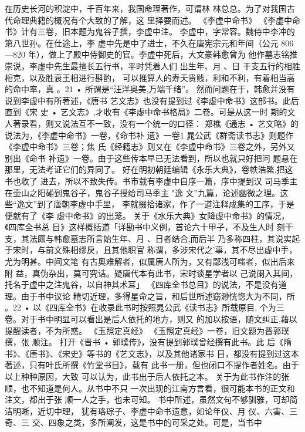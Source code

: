 在历史长河的积淀中，千百年来，我国命理著作，可谓林
林总总。为了对我国古代命理典籍的概况有个大致的了解，这
里择要而述。
《李虚中命书》
《李虚中命书》计有三卷，旧本题为鬼谷子撰，李虚中注。
李虚中，字常容。魏侍中李冲的第八世孙。在仕途上，李
虚中先是中了进士，不久在唐宪宗元和年间（公元 806—820
年），做上了殿中侍御史的官。李虚中死后，大文豪韩愈曾为
他作墓志铭推崇说，李虚中先生最擅长五行书，平时凭着人们
出生年、月 、日 干支五行的相胜相克，以及胜衰王相进行斟酌，
可以推算人的寿夭贵贱，利和不利，有着相当高的命中率，真
。21 •
所谓是“汪洋奥美,万端千绪”。
然而问题在于，韩愈并没有说到李虚中有所著述，《唐书
艺文志》也没有提到过《李虚中命书》这部书。此后直到《宋
史 • 艺文志》,才收有《李虚中命书格局》二卷。可是从这一时
期的文人著录看，则又说法互不一致，没有一个统一的口径：
郑樵《通志 • 艺文略》的说法为，《李虚中命书》一卷，《命书补
遗》一卷1 晁公武《群斋读书志》则题作《李虚中命书》三卷；焦
氏《经籍志》则又在《李虚中命书》三卷之外，另外又别出《命书
补遗》一卷。由于这些传本早已无法看到，所以也就只好把问
题悬在那里，无法考证它们的异同了。
好在明初朝廷编辑《永乐大典》，卷帙浩繁,把这书也收了
进去，所以不致失传。书市载有李虚中自序一篇，序中提到汉
司马季主在壶山之阳碰到鬼谷子，鬼谷子授给司马季主 "逸
文”九篇，论述幽微之理。这些“逸文”到了唐朝李虚中手里，
李就掇拾诸家，作了一道注释成集的工序，于是便就有了《李
虚中命书》的出笼。
关于《水乐大典》女降虚中命书》的情况，《四库全书总
目》这样概括道「详勘书中义例，首论六十甲子，不及生人时
刻干支，其法颇与韩愈墓志所言始生年、月 、日者结合,而后半
乃多称四柱，其说实起于宋时，与前文殊相缪戾，且其他职官
称谓，多涉宋代之'事，其不尽出虚中手，尤为明甚。中间文笔
有古奥难解者，似属唐人所为，又有鄙浅可嗤者，似出后来附
益，真伪杂出，莫可究诘。疑唐代本有此书，宋时谈星学者以
己说阑入其间，托名于虚中之注鬼谷，以自神其术耳」
《四库全书总目》的说法，不是没有道理。由于书中议论
精切近理，多得星命之旨，和后世所述窈渺恍惚大为不同，所
。22 •
以《四库全书》在收录此书时按照晁公武《读书志》所载原目,
个为三卷。对于书中明显可以看出是后人依托的地方，则又
的加以按语，随文纠正,藉以提醒读者，不为所惑。
《玉照定真经》
《玉照定真经》一卷，旧文题为晋郭璞撰，张 顺注。
打开《晋书 • 郭璞传》，没有提到郭璞曾经撰有此书。此
后《隋书》、《唐书》、《宋史》等书的《艺文志》，以及其他诸家书
目，都没有提到过这本著述，只有叶氏所撰《竹堂书目》，载有
此书一册，但也闭口不提作者姓名。由于以上种种原因，大致
可以认为，此书出于后人依托之本。
关于为此书作注的张顺，也不知道是何人。从书中不只
一次出现的江南方言看，很可能本书的正文和注文，都出于张
顺一人之手，也未可知。
书中所述，虽然文句不够驯雅，可却简洁明晰，近切中理，
犹有珞琮子、李虚中命书遗意，如论年仪、月 仪、六害、三奇、三
交、四象之类，多所阐发，这是书中的可采之处。可是，当书中
